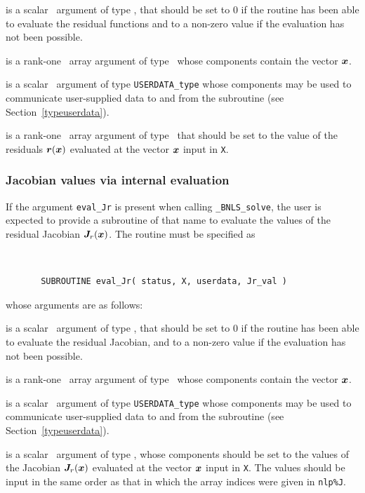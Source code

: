 \documentclass{galahad}
\newcommand{\packagename}{BNLS}
\newcommand{\fullpackagename}{\libraryname\_\packagename}
\newcommand{\solver}{{\tt \fullpackagename\_solve}}
\begin{document}
\begin{description}
 is a scalar \intentout\ argument of type \integer,
that should be set to 0 if the routine has been able to evaluate
the residual functions
and to a non-zero value if the evaluation has not been possible.

 is a rank-one \intentin\ array argument of type \realdp\
whose components contain the vector ${\bm{x}}$.

 is a scalar \intentinout\ argument of type
{\tt USERDATA\_type} whose components may be used
to communicate user-supplied data to and from the subroutine
(see Section~\ref{typeuserdata}).

 is a rank-one \intentout\ array argument of type \realdp\
that should be set to the value of the residuals ${\bm{r}}({\bm{x}})$
evaluated at the vector ${\bm{x}}$ input in {\tt X}.

\end{description}


\subsubsection{Jacobian values via internal evaluation\label{jfv}}

If the argument {\tt eval\_Jr} is present when calling \solver, the
user is expected to provide a subroutine of that name to evaluate the
values of the residual Jacobian ${\bm{J}}_r({\bm{x}})$.
The routine must be specified as

\def\baselinestretch{0.8}
{\tt
\begin{verbatim}
       SUBROUTINE eval_Jr( status, X, userdata, Jr_val )
\end{verbatim} }
\def\baselinestretch{1.0}
\noindent whose arguments are as follows:

\begin{description}
 is a scalar \intentout\ argument of type \integer,
that should be set to 0 if the routine has been able to evaluate
the residual Jacobian,
and to a non-zero value if the evaluation has not been possible.

\ittf{X} is a rank-one \intentin\ array argument of type \realdp\
whose components contain the vector ${\bm{x}}$.

\itt{userdata} is a scalar \intentinout\ argument of type
{\tt USERDATA\_type} whose components may be used
to communicate user-supplied data to and from the subroutine
(see Section~\ref{typeuserdata}).

\itt{Jr\_val} is a scalar \intentout\ argument of type \realdp,
whose components should be set to the values
of the Jacobian ${\bm{J}}_r({\bm{x}})$
evaluated at the vector ${\bm{x}}$ input in {\tt X}.
The values should
be input in the same order as that in which the array indices were
given in {\tt nlp\%J}.

\end{description}
\end{document}

